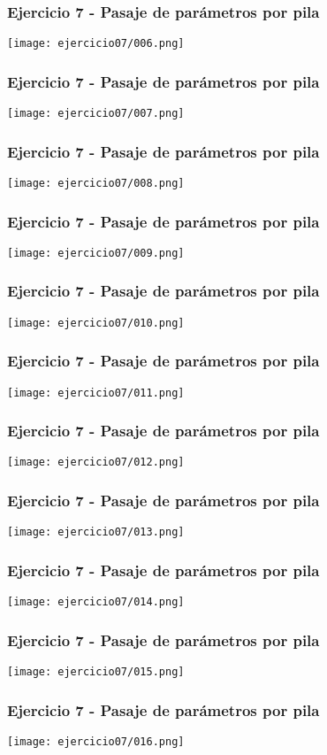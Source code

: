 \documentclass{beamer}
\begin{document}
\begin{frame}
\frametitle{Ejercicio 7 - Pasaje de parámetros por pila}
\texttt{[image: ejercicio07/006.png]}
\end{frame}
\begin{frame}
\frametitle{Ejercicio 7 - Pasaje de parámetros por pila}
\texttt{[image: ejercicio07/007.png]}
\end{frame}
\begin{frame}
\frametitle{Ejercicio 7 - Pasaje de parámetros por pila}
\texttt{[image: ejercicio07/008.png]}
\end{frame}
\begin{frame}
  \frametitle{Ejercicio 7 - Pasaje de parámetros por pila}
\texttt{[image: ejercicio07/009.png]}
\end{frame}
\begin{frame}
\frametitle{Ejercicio 7 - Pasaje de parámetros por pila}
\texttt{[image: ejercicio07/010.png]}
\end{frame}

\begin{frame}
\frametitle{Ejercicio 7 - Pasaje de parámetros por pila}
\texttt{[image: ejercicio07/011.png]}
\end{frame}

\begin{frame}
\frametitle{Ejercicio 7 - Pasaje de parámetros por pila}
\texttt{[image: ejercicio07/012.png]}
\end{frame}

\begin{frame}
\frametitle{Ejercicio 7 - Pasaje de parámetros por pila}
\texttt{[image: ejercicio07/013.png]}
\end{frame}

\begin{frame}
\frametitle{Ejercicio 7 - Pasaje de parámetros por pila}
\texttt{[image: ejercicio07/014.png]}
\end{frame}

\begin{frame}
\frametitle{Ejercicio 7 - Pasaje de parámetros por pila}
\texttt{[image: ejercicio07/015.png]}
\end{frame}

\begin{frame}
\frametitle{Ejercicio 7 - Pasaje de parámetros por pila}
\texttt{[image: ejercicio07/016.png]}
\end{frame}
\end{document}
